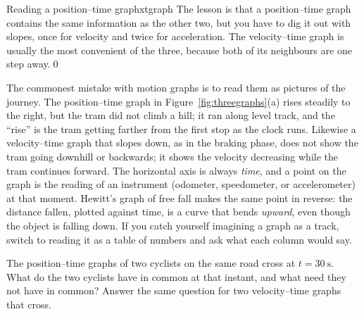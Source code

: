 \begin{example}{Reading a position--time graph}{xtgraph}
The lesson is that a position--time graph contains the same information as the other two, but you have to dig it out with slopes, once for velocity and twice for acceleration. The velocity--time graph is usually the most convenient of the three, because both of its neighbours are one step away.\qed
\end{example}

\begin{modelnote}
The commonest mistake with motion graphs is to read them as pictures of the journey. The position--time graph in Figure~\ref{fig:threegraphs}(a) rises steadily to the right, but the tram did not climb a hill; it ran along level track, and the ``rise'' is the tram getting farther from the first stop as the clock runs. Likewise a velocity--time graph that slopes down, as in the braking phase, does not show the tram going downhill or backwards; it shows the velocity decreasing while the tram continues forward. The horizontal axis is always \emph{time}, and a point on the graph is the reading of an instrument (odometer, speedometer, or accelerometer) at that moment. Hewitt's graph of free fall makes the same point in reverse: the distance fallen, plotted against time, is a curve that bends \emph{upward}, even though the object is falling down. If you catch yourself imagining a graph as a track, switch to reading it as a table of numbers and ask what each column would say.
\end{modelnote}

\begin{checkbox}
The position--time graphs of two cyclists on the same road cross at $t = \SI{30}{\second}$. What do the two cyclists have in common at that instant, and what need they not have in common? Answer the same question for two velocity--time graphs that cross.
\end{checkbox}

